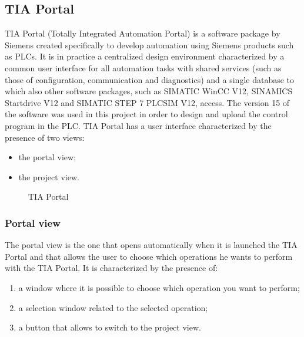 \subsection{TIA Portal}
TIA Portal (Totally Integrated Automation Portal) is a software package by Siemens created specifically to develop automation using Siemens products such as PLCs. It is in practice a centralized design environment characterized by a common user interface for all automation tasks with shared services (such as those of configuration, communication and diagnostics) and a single database to which also other software packages, such as SIMATIC WinCC V12, SINAMICS Startdrive V12 and SIMATIC STEP 7 PLCSIM V12, access.
The version 15 of the software was used in this project in order to design and upload the control program in the PLC.
TIA Portal has a user interface characterized by the presence of two views:
\begin{itemize}
    \item the portal view;
    \item the project view.
\end{itemize}

\begin{figure}[!h]
\centering
{}
\qquad
{}
\caption{TIA Portal}
\label{first_signal}
\end{figure}

\subsubsection{Portal view}
The portal view is the one that opens automatically when it is launched the TIA Portal and that allows the user to choose which operations he wants to perform with the TIA Portal. It is characterized by the presence of:
\begin{enumerate}
    \item a window where it is possible to choose which operation you want to perform;
    \item a selection window related to the selected operation;
    \item a button that allows to switch to the project view.
\end{enumerate}

